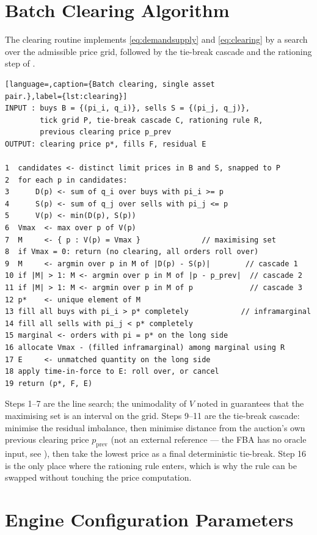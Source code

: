 \chapter{Batch Clearing Algorithm}
\label{app:algorithm}

The clearing routine implements \eqref{eq:demandsupply} and
\eqref{eq:clearing} by a search over the admissible price grid, followed
by the tie-break cascade and the rationing step of
.

\begin{lstlisting}[language=,caption={Batch clearing, single asset
pair.},label={lst:clearing}]
INPUT : buys B = {(pi_i, q_i)}, sells S = {(pi_j, q_j)},
        tick grid P, tie-break cascade C, rationing rule R,
        previous clearing price p_prev
OUTPUT: clearing price p*, fills F, residual E

1  candidates <- distinct limit prices in B and S, snapped to P
2  for each p in candidates:
3      D(p) <- sum of q_i over buys with pi_i >= p
4      S(p) <- sum of q_j over sells with pi_j <= p
5      V(p) <- min(D(p), S(p))
6  Vmax  <- max over p of V(p)
7  M     <- { p : V(p) = Vmax }              // maximising set
8  if Vmax = 0: return (no clearing, all orders roll over)
9  M     <- argmin over p in M of |D(p) - S(p)|        // cascade 1
10 if |M| > 1: M <- argmin over p in M of |p - p_prev|  // cascade 2
11 if |M| > 1: M <- argmin over p in M of p             // cascade 3
12 p*    <- unique element of M
13 fill all buys with pi_i > p* completely            // inframarginal
14 fill all sells with pi_j < p* completely
15 marginal <- orders with pi = p* on the long side
16 allocate Vmax - (filled inframarginal) among marginal using R
17 E     <- unmatched quantity on the long side
18 apply time-in-force to E: roll over, or cancel
19 return (p*, F, E)
\end{lstlisting}

Steps 1--7 are the line search; the unimodality of $V$ noted in
 guarantees that the maximising set is an interval on
the grid. Steps 9--11 are the tie-break cascade: minimise the residual
imbalance, then minimise distance from the auction's own previous
clearing price $p_{\mathrm{prev}}$ (not an external reference — the FBA
has no oracle input, see ), then take the lowest price
as a final deterministic tie-break. Step 16 is the only place where the
rationing rule enters, which is why the rule can be swapped without
touching the price computation.

\chapter{Engine Configuration Parameters}
\label{app:config}

